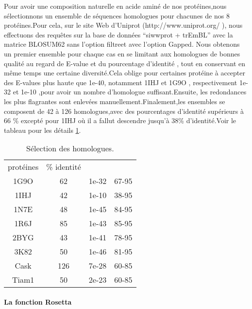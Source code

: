 Pour avoir une composition naturelle en acide aminé de nos protéines,nous sélectionnons un ensemble de séquences homologues pour chacunes de nos 8 protéines.Pour cela, sur le site Web d'Uniprot (http://www.uniprot.org/ ), nous effectuons des requêtes sur la base de données ``siwwprot + trEmBL'' avec la matrice BLOSUM62 sans l'option \og filtre\fg et avec l'option \og Gapped\fg. Nous obtenons un premier ensemble pour chaque cas en se limitant aux homologues de bonnes qualité au regard de E-value et du pourcentage d'identité , tout en conservant  en même temps une certaine diversité.Cela oblige pour certaines protéine à accepter des E-values plus haute que  1e-40, notamment 1IHJ et 1G9O , respectivement 1e-32 et 1e-10 ,pour avoir un nombre d'homologue suffisant.Ensuite, les redondances les plus flagrantes sont enlevées manuellement.Finalement,les ensembles se composent de 42 à 126 homologues,avec des pourcentages d'identité supérieurs à 66 \% excepté pour 1IHJ où il a fallut descendre jusqu'à 38\% d'identité.Voir le tableau pour les détails \ref{tab:select_homo}.


    \begin{table}[!htbp]
      \centering

      \begin{tabular}{cccc}

        \toprule
        protéines & \% identité \\
        \cmidrule{1-4}
     1G9O  & 62  &    1e-32  &  67-95 \\
     1IHJ  & 42  &    1e-10  &  38-95 \\
     1N7E  & 48  &    1e-45  &  84-95 \\
     1R6J  & 85  &    1e-43  &  85-95 \\
     2BYG  & 43  &    1e-41  &  78-95 \\
     3K82  & 50  &    1e-46  &  81-95 \\
     Cask  & 126 &    7e-28  &  60-85 \\
     Tiam1 & 50  &    2e-23  &  60-85 \\

        \bottomrule

      \end{tabular}      
      \caption{Sélection des homologues.}
\label{tab:select_homo}      
    \end{table}


\paragraph{La fonction Rosetta}

